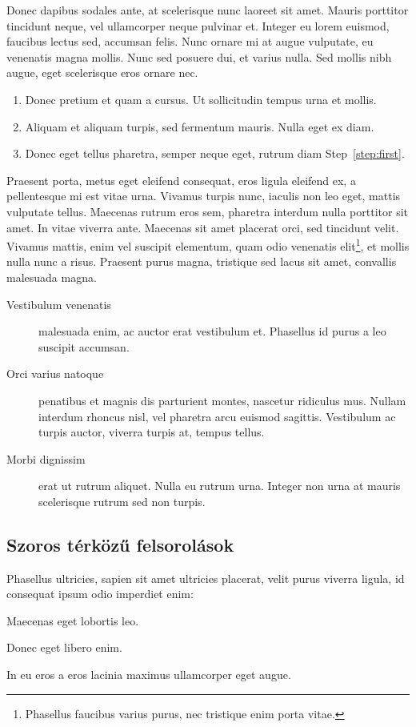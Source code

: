 Donec dapibus sodales ante, at scelerisque nunc laoreet sit amet. Mauris porttitor tincidunt neque, vel ullamcorper neque pulvinar et. Integer eu lorem euismod, faucibus lectus sed, accumsan felis. Nunc ornare mi at augue vulputate, eu venenatis magna mollis. Nunc sed posuere dui, et varius nulla. Sed mollis nibh augue, eget scelerisque eros ornare nec.

\begin{enumerate}
	\item\label{step:first} Donec pretium et quam a cursus. Ut sollicitudin tempus urna et mollis.
	\item Aliquam et aliquam turpis, sed fermentum mauris. Nulla eget ex diam.
	\item Donec eget tellus pharetra, semper neque eget, rutrum diam Step~\ref{step:first}.
\end{enumerate}

Praesent porta, metus eget eleifend consequat, eros ligula eleifend ex, a pellentesque mi est vitae urna. Vivamus turpis nunc, iaculis non leo eget, mattis vulputate tellus. Maecenas rutrum eros sem, pharetra interdum nulla porttitor sit amet. In vitae viverra ante. Maecenas sit amet placerat orci, sed tincidunt velit. Vivamus mattis, enim vel suscipit elementum, quam odio venenatis elit\footnote{Phasellus faucibus varius purus, nec tristique enim porta vitae.}, et mollis nulla nunc a risus. Praesent purus magna, tristique sed lacus sit amet, convallis malesuada magna.

\begin{description}
	\item[Vestibulum venenatis] malesuada enim, ac auctor erat vestibulum et. Phasellus id purus a leo suscipit accumsan.
	\item[Orci varius natoque] penatibus et magnis dis parturient montes, nascetur ridiculus mus. Nullam interdum rhoncus nisl, vel pharetra arcu euismod sagittis. Vestibulum ac turpis auctor, viverra turpis at, tempus tellus.
	\item[Morbi dignissim] erat ut rutrum aliquet. Nulla eu rutrum urna. Integer non urna at mauris scelerisque rutrum sed non turpis.
\end{description}

\subsection{Szoros térközű felsorolások}

Phasellus ultricies, sapien sit amet ultricies placerat, velit purus viverra ligula, id consequat ipsum odio imperdiet enim:
\begin{compactenum}
	\item Maecenas eget lobortis leo.
	\item Donec eget libero enim.
	\item In eu eros a eros lacinia maximus ullamcorper eget augue.
\end{compactenum}

